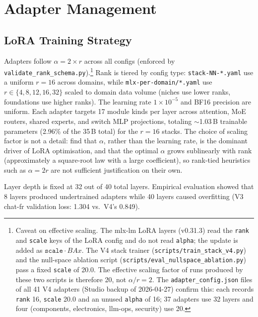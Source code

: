 \documentclass[11pt,a4paper]{article}
\begin{document}
\section{Adapter Management}
\label{sec:adapters}

\subsection{LoRA Training Strategy}

Adapters follow $\alpha = 2 \times r$ across all configs (enforced by \texttt{validate\_rank\_schema.py}).\footnote{Caveat on effective scaling. The mlx-lm LoRA layers (v0.31.3) read the \texttt{rank} and \texttt{scale} keys of the LoRA config and do not read \texttt{alpha}; the update is added as $\texttt{scale}\cdot BAx$. The V4 stack trainer (\texttt{scripts/train\_stack\_v4.py}) and the null-space ablation script (\texttt{scripts/eval\_nullspace\_ablation.py}) pass a fixed \texttt{scale} of 20.0. The effective scaling factor of runs produced by these two scripts is therefore 20, not $\alpha/r = 2$. The \texttt{adapter\_config.json} files of all 41 V4 adapters (Studio backup of 2026-04-27) confirm this: each records \texttt{rank} 16, \texttt{scale} 20.0 and an unused \texttt{alpha} of 16; 37 adapters use 32 layers and four (components, electronics, llm-ops, security) use 20.} Rank is tiered by config type: \texttt{stack-NN-*.yaml} use a uniform $r{=}16$ across domains, while \texttt{mlx-per-domain/*.yaml} use $r \in \{4, 8, 12, 16, 32\}$ scaled to domain data volume (niches use lower ranks, foundations use higher ranks). The learning rate $1 \times 10^{-5}$ and BF16 precision are uniform. Each adapter targets 17 module kinds per layer across attention, MoE routers, shared experts, and switch MLP projections, totaling ${\sim}$1.03\,B trainable parameters (2.96\% of the 35\,B total) for the $r{=}16$ stacks. The choice of scaling factor is not a detail: \citet{zhang2026loraalpha} find that $\alpha$, rather than the learning rate, is the dominant driver of LoRA optimisation, and that the optimal $\alpha$ grows sublinearly with rank (approximately a square-root law with a large coefficient), so rank-tied heuristics such as $\alpha = 2r$ are not sufficient justification on their own.

Layer depth is fixed at 32 out of 40 total layers. Empirical evaluation showed that 8 layers produced undertrained adapters while 40 layers caused overfitting (V3 chat-fr validation loss: 1.304 vs.\ V4's 0.849).
\end{document}

